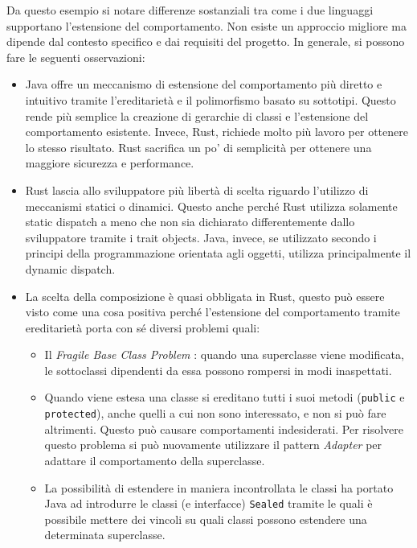 Da questo esempio si notare differenze sostanziali tra come i due linguaggi supportano l'estensione del comportamento. Non esiste un approccio migliore ma dipende dal contesto specifico e dai requisiti del progetto. In generale, si possono fare le seguenti osservazioni:
\begin{itemize}
    \item Java offre un meccanismo di estensione del comportamento più diretto e intuitivo tramite l'ereditarietà e il polimorfismo basato su sottotipi. Questo rende più semplice la creazione di gerarchie di classi e l'estensione del comportamento esistente. Invece, Rust, richiede molto più lavoro per ottenere lo stesso risultato. Rust sacrifica un po' di semplicità per ottenere una maggiore sicurezza e performance.
    \item Rust lascia allo sviluppatore più libertà di scelta riguardo l'utilizzo di meccanismi statici o dinamici. Questo anche perché Rust utilizza solamente static dispatch a meno che non sia dichiarato differentemente dallo sviluppatore tramite i trait objects. Java, invece, se utilizzato secondo i principi della programmazione orientata agli oggetti, utilizza principalmente il dynamic dispatch.
    \item La scelta della composizione è quasi obbligata in Rust, questo può essere visto come una cosa positiva perché l'estensione del comportamento tramite ereditarietà porta con sé diversi problemi quali:
    \begin{itemize}
        \item Il \textit{Fragile Base Class Problem} \cite{mikhajlov-sekerinski-fragile-base-class}: quando una superclasse viene modificata, le sottoclassi dipendenti da essa possono rompersi in modi inaspettati.
        \item Quando viene estesa una classe si ereditano tutti i suoi metodi (\texttt{public} e \texttt{protected}), anche quelli a cui non sono interessato, e non si può fare altrimenti. Questo può causare comportamenti indesiderati. Per risolvere questo problema si può nuovamente utilizzare il pattern \textit{Adapter} per adattare il comportamento della superclasse.
        \item La possibilità di estendere in maniera incontrollata le classi ha portato Java ad introdurre le classi (e interfacce) \texttt{Sealed} tramite le quali è possibile mettere dei vincoli su quali classi possono estendere una determinata superclasse.
    \end{itemize}
\end{itemize}
